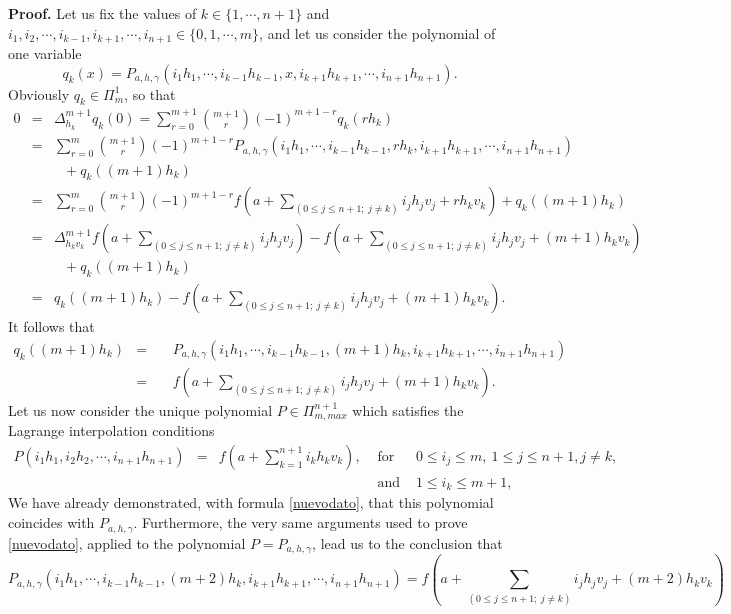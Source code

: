 \documentclass[10pt,a4paper]{amsart}
\theoremstyle{definition}
\begin{document}
\noindent \textbf{Proof. } Let us fix the values of  $k\in\{1,\cdots,n+1\}$ and $i_1,i_2,\cdots,i_{k-1},i_{k+1},\cdots,i_{n+1}\in\{0,1,\cdots,m\}$, and let us consider the polynomial of one variable  
$$q_k(x)=P_{a,h,\gamma}(i_1h_1,\cdots, i_{k-1}h_{k-1},x,i_{k+1}h_{k+1}, \cdots,i_{n+1}h_{n+1}) .$$ 
Obviously $q_k\in\Pi_m^1$, so that
\begin{eqnarray*}
0 &=& \Delta_{h_k}^{m+1}q_k(0)=\sum_{r=0}^{m+1}\binom{m+1}{r}(-1)^{m+1-r}q_k(rh_k) \\
&=& \sum_{r=0}^{m}\binom{m+1}{r}(-1)^{m+1-r}P_{a,h,\gamma}(i_1h_1,\cdots, i_{k-1}h_{k-1},rh_k,i_{k+1}h_{k+1}, \cdots,i_{n+1}h_{n+1}) \\
&\ & \ \ \ + q_k((m+1)h_k)\\
&=& \sum_{r=0}^{m}\binom{m+1}{r}(-1)^{m+1-r}f(a+\sum_{(0\leq j\leq n+1;\ j\neq k)} i_jh_jv_j+ rh_kv_k) + q_k((m+1)h_k)\\
&=& \Delta_{h_kv_k}^{m+1}f(a+\sum_{(0\leq j\leq n+1;\ j\neq k)} i_jh_jv_j) -f(a+\sum_{(0\leq j\leq n+1;\ j\neq k)} i_jh_jv_j+ (m+1)h_kv_k)\\
&\ & \ \ \ + q_k((m+1)h_k)\\
&=&  q_k((m+1)h_k)-f(a+\sum_{(0\leq j\leq n+1;\ j\neq k)} i_jh_jv_j+ (m+1)h_kv_k).
\end{eqnarray*}
It follows that  
\begin{equation} \label{nuevodato}
 \begin{array}{cccccccc}
q_k((m+1)h_k) & = & \  &   P_{a,h,\gamma}(i_1h_1,\cdots, i_{k-1}h_{k-1},(m+1)h_k,i_{k+1}h_{k+1}, \cdots,i_{n+1}h_{n+1}) \\
\  & = & \  &  f(a+\sum_{(0\leq j\leq n+1;\ j\neq k)} i_jh_jv_j+ (m+1)h_kv_k).
\end{array}
\end{equation}
Let us now consider the unique  polynomial $P\in\Pi_{m,max}^{n+1}$ which satisfies the Lagrange interpolation conditions 
\[
\begin{array}{llllll}
P(i_1h_1,i_2h_2,\cdots,i_{n+1}h_{n+1}) &=& f(a+\sum_{k=1}^{n+1}i_kh_kv_k), & \text{ for all  } &   0\leq i_j\leq m, \ 1\leq j\leq n+1, j\neq k,\\
\ & \ & \ & \text{ and all } & 1\leq i_k\leq m+1,
\end{array}
\] 
We have already demonstrated, with formula \eqref{nuevodato}, that this polynomial  coincides with  $P_{a,h,\gamma}$. Furthermore, the very same arguments used to prove  \eqref{nuevodato}, applied to the polynomial $P=P_{a,h,\gamma}$, lead us to the conclusion that 
\[
 P_{a,h,\gamma}(i_1h_1,\cdots, i_{k-1}h_{k-1},(m+2)h_k,i_{k+1}h_{k+1}, \cdots,i_{n+1}h_{n+1}) =  f(a+\sum_{(0\leq j\leq n+1;\ j\neq k)} i_jh_jv_j+ (m+2)h_kv_k)
\]
\end{document}
